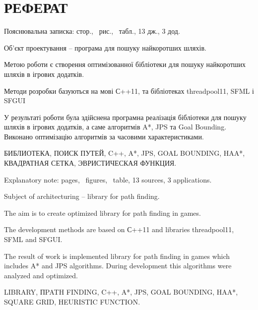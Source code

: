 \section*{РЕФЕРАТ}

\vspace{1\baselineskip}

\thispagestyle{empty}

Пояснювальна записка: \pageref{LastPage} стор.,  \totalfigures\ рис., \totaltables\ табл., 13 дж., 3 дод.

Об'єкт проектування -- програма для пошуку найкоротших шляхів.

Метою роботи є створення оптимізованної бібліотеки для пошуку найкоротших шляхів в ігрових додатків.

Методи розробки базуються на мові С++11, та бібліотеках threadpool11, SFML і SFGUI

У результаті роботи була здійснена програмна реалізація бібліотеки для пошуку шляхів в ігрових додатків, а саме алгоритмів A*, JPS та Goal Bounding. Виконано оптимізацію алгоритмів за
часовими характеристиками.

БИБЛИОТЕКА, ПОИСК ПУТЕЙ, C++, A*, JPS, GOAL BOUNDING, HAA*, КВАДРАТНАЯ СЕТКА, ЭВРИСТИЧЕСКАЯ ФУНКЦИЯ.

\vspace{1\baselineskip}

Explanatory note: \pageref{LastPage} pages,  \totalfigures\ figures, \totaltables\ table, 13 sources, 3 applications.

Subject of architecturing -- library for path finding.

The aim is to create optimized library for path finding in games.

The development methods are based on С++11 and libraries threadpool11, SFML and SFGUI.

The result of work is implemented library for path finding in games which includes A* and JPS algorithms. During development this algorithms were analyzed and optimized.

LIBRARY, ПPATH FINDING, C++, A*, JPS, GOAL BOUNDING, HAA*, SQUARE GRID, HEURISTIC FUNCTION.